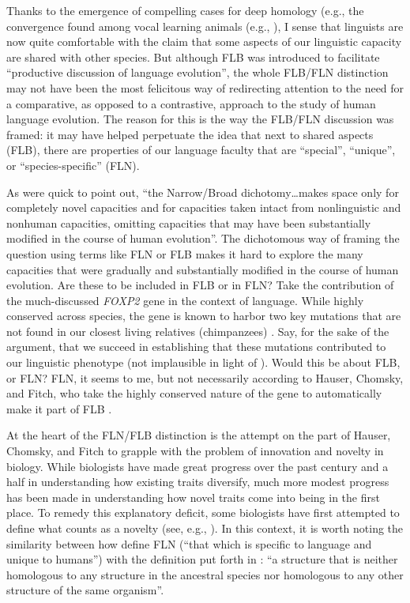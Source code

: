 Thanks to the emergence of compelling cases for deep homology (e.g., the convergence found among vocal learning animals (e.g., \cite{pfenning2014convergent}), I sense that linguists are now quite comfortable with the claim that some aspects of our linguistic capacity are shared with other species. But although FLB was introduced to facilitate 
``productive discussion of language evolution'', the whole FLB/FLN distinction may not have been the most felicitous way of redirecting attention to the need for a comparative, as opposed to a contrastive, approach to the study of human language evolution. The reason for this is the way the FLB/FLN discussion was framed: it may have helped perpetuate the idea that next to shared aspects (FLB), there are properties of our language faculty that are ``special'', ``unique'', or ``species-specific'' (FLN).

As  \cite{jackendoff2005nature} were quick to point out, ``the Narrow/Broad dichotomy\dots makes space only for completely novel capacities and for capacities taken intact from nonlinguistic and nonhuman capacities, omitting capacities that may have been substantially modified in the course of human evolution''. The dichotomous way of framing the question using terms like FLN or FLB makes it hard to explore the many capacities that were gradually and substantially modified in the course of human evolution. Are these  to be included in FLB or in FLN? Take the contribution of the much-discussed \textit{FOXP2} gene in the context of language. While highly conserved across species, the gene is known to harbor two key mutations that are not found in our closest living relatives (chimpanzees) \citep{enard2002molecular}. Say, for the sake of the argument, that we succeed in establishing that these mutations contributed to our linguistic phenotype (not implausible in light of \cite{enard2009humanized}). Would this be about FLB, or FLN? FLN, it seems to me, but not necessarily according to Hauser, Chomsky, and Fitch, who take the highly conserved nature of the gene to automatically make it part of FLB \citep{fitch2005evolution}.

At the heart of the FLN/FLB distinction is the attempt on the part of Hauser, Chomsky, and Fitch to grapple with the problem of innovation and novelty in biology. While biologists have made great progress over the past century and a half in understanding how existing traits diversify, much more modest progress has been made in understanding how novel traits come into being in the first place. To remedy this explanatory deficit, some biologists have first attempted to define what counts as a novelty (see, e.g., \cite{muller2005innovation}). In this context, it is worth noting the similarity between how \cite{fitch2005evolution} define FLN (``that which is specific to language and unique to humans'') with the definition put forth in \cite{muller1991novelty}: ``a structure that is neither homologous to any structure in the ancestral species nor homologous to any other structure of the same organism''.

